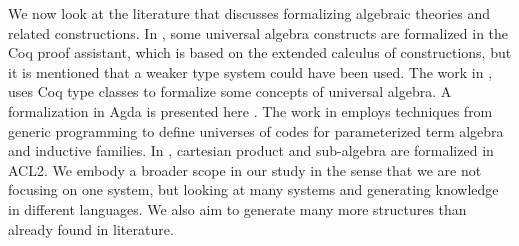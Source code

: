 We now look at the literature that discusses formalizing algebraic theories and related constructions. In 
\cite{capretta1999universal}, some universal algebra constructs are formalized in the Coq proof 
assistant, which is based on the extended calculus of constructions, but it is mentioned that a 
weaker type system could have been used. The work in \cite{spitters2011type}, uses Coq type classes 
to formalize some concepts of universal algebra. A formalization in Agda is presented here 
\cite{gunther2018formalization}.  The work in \cite{benke2003universes} employs techniques from 
generic programming to define universes of codes for parameterized term algebra and inductive 
families. In \cite{Heras2015}, cartesian product and sub-algebra are formalized in ACL2. 
We embody a broader scope in our study in the sense that we are not focusing on one system, but 
looking at many systems and generating knowledge in different languages. We also aim to generate 
many more structures than already found in literature. 

